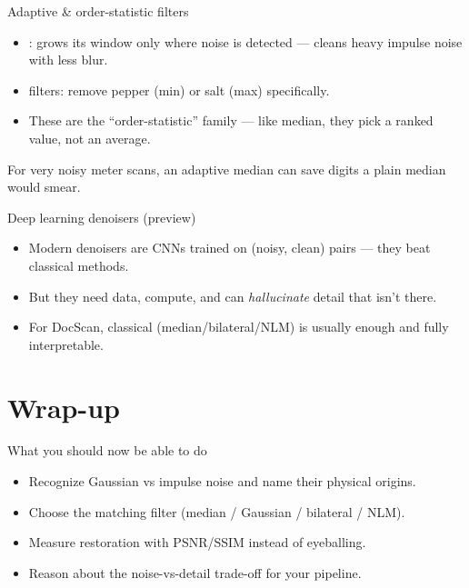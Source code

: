 \documentclass[10pt,aspectratio=169]{beamer}
\begin{document}
\begin{frame}{Adaptive \& order-statistic filters}
  \begin{itemize}
    \item {}: grows its window only where noise is detected — cleans heavy impulse noise with less blur.
    \item {} filters: remove pepper (min) or salt (max) specifically.
    \item These are the ``order-statistic'' family — like median, they pick a ranked value, not an average.
  \end{itemize}
  \begin{goodbox}
    For very noisy meter scans, an adaptive median can save digits a plain median would smear.
  \end{goodbox}
\end{frame}

\begin{frame}{Deep learning denoisers (preview)}
  \begin{itemize}
    \item Modern denoisers are CNNs trained on (noisy, clean) pairs — they beat classical methods.
    \item But they need data, compute, and can \emph{hallucinate} detail that isn't there.
    \item For DocScan, classical (median/bilateral/NLM) is usually enough and fully interpretable.
  \end{itemize}
\end{frame}

\section{Wrap-up}

\begin{frame}{What you should now be able to do}
  \begin{itemize}
    \item Recognize Gaussian vs impulse noise and name their physical origins.
    \item Choose the matching filter (median / Gaussian / bilateral / NLM).
    \item Measure restoration with PSNR/SSIM instead of eyeballing.
    \item Reason about the noise-vs-detail trade-off for your pipeline.
  \end{itemize}
\end{frame}
\end{document}
